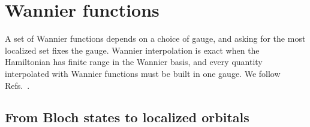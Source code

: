\section{Wannier functions}\label{sec:3.6}

A set of Wannier functions depends on a choice of gauge, and asking for the most localized set fixes the gauge. Wannier interpolation is exact when the Hamiltonian has finite range in the Wannier basis, and every quantity interpolated with Wannier functions must be built in one gauge. We follow Refs.~\cite{marzari1997maximally,souza2001maximally,marzari2012maximally}.

\subsection{From Bloch states to localized orbitals}

